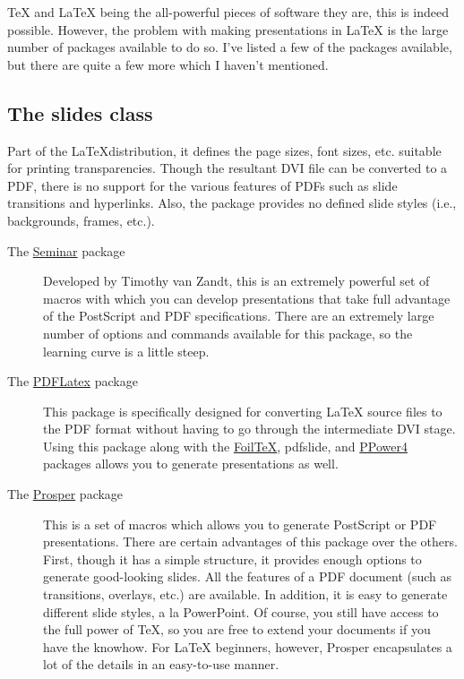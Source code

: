 \documentclass[a4paper,12pt,final,notitlepage]{article}
\begin{document}
TeX and LaTeX being the all-powerful pieces of software they are, this
is indeed possible. However, the problem with making presentations in
LaTeX is the large number of packages available to do so.  I've listed
a few of the packages available, but there are quite a few more which
I haven't mentioned.


\subsection{The slides class}

Part of the \LaTeX distribution, it defines the page
sizes, font sizes, etc. suitable for printing transparencies.
Though the resultant DVI file can be converted to a PDF,
there is no support for the various features of PDFs such
as slide transitions and hyperlinks. Also, the package
provides no defined slide styles (i.e., backgrounds, frames,
etc.).

\begin{description}
   \item[The 
      \href{http://freshmeat.net/projects/seminar/}{Seminar}
      package] 
      Developed by Timothy van Zandt, this is an extremely powerful
      set of macros with which you can develop presentations that
      take full advantage of the PostScript and PDF
      specifications. There are an extremely large number of
      options and commands available for this package, so the
      learning curve is a little steep.

      \item[The 
      \href{http://www.cs.berkeley.edu/~mdw/proj/texslides/}{PDFLatex} package]
      This package is specifically designed for
      converting LaTeX source files to the PDF format without having
      to go through the intermediate DVI stage. Using this
      package along with the 
      \href{http://freshmeat.net/projects/foiltex/}{FoilTeX},
      pdfslide, and 
      \href{http://freshmeat.net/projects/ppower4/}{PPower4}
      packages allows you to generate presentations as well.
      
      \item[ The \href{http://freshmeat.net/projects/prosper/}{Prosper} package]
      This is a set of macros which allows you to generate
      PostScript or PDF presentations. There are certain advantages
      of this package over the others. First, though it has a
      simple structure, it provides enough options to
      generate good-looking slides. All the features of a PDF
      document (such as transitions, overlays, etc.) are
      available. In addition, it is easy to generate different slide
      styles, a la PowerPoint. Of course, you still have access to the
      full power of TeX, so you are free to extend your documents if
      you have the knowhow. For LaTeX beginners, however, Prosper
      encapsulates a lot of the details in an easy-to-use manner.
\end{description}
\end{document}
